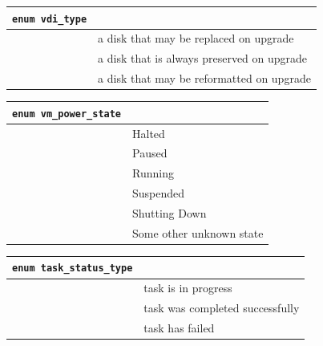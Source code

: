 \vspace{1cm}
\begin{longtable}{|ll|}
\hline
{\tt enum vdi\_type} & \\
\hline
\hspace{0.5cm}{\tt system} & a disk that may be replaced on upgrade \\
\hspace{0.5cm}{\tt user} & a disk that is always preserved on upgrade \\
\hspace{0.5cm}{\tt ephemeral} & a disk that may be reformatted on upgrade \\
\hline
\end{longtable}

\vspace{1cm}
\begin{longtable}{|ll|}
\hline
{\tt enum vm\_power\_state} & \\
\hline
\hspace{0.5cm}{\tt Halted} & Halted \\
\hspace{0.5cm}{\tt Paused} & Paused \\
\hspace{0.5cm}{\tt Running} & Running \\
\hspace{0.5cm}{\tt Suspended} & Suspended \\
\hspace{0.5cm}{\tt ShuttingDown} & Shutting Down \\
\hspace{0.5cm}{\tt Unknown} & Some other unknown state \\
\hline
\end{longtable}

\vspace{1cm}
\begin{longtable}{|ll|}
\hline
{\tt enum task\_status\_type} & \\
\hline
\hspace{0.5cm}{\tt pending} & task is in progress \\
\hspace{0.5cm}{\tt success} & task was completed successfully \\
\hspace{0.5cm}{\tt failure} & task has failed \\
\hline
\end{longtable}


